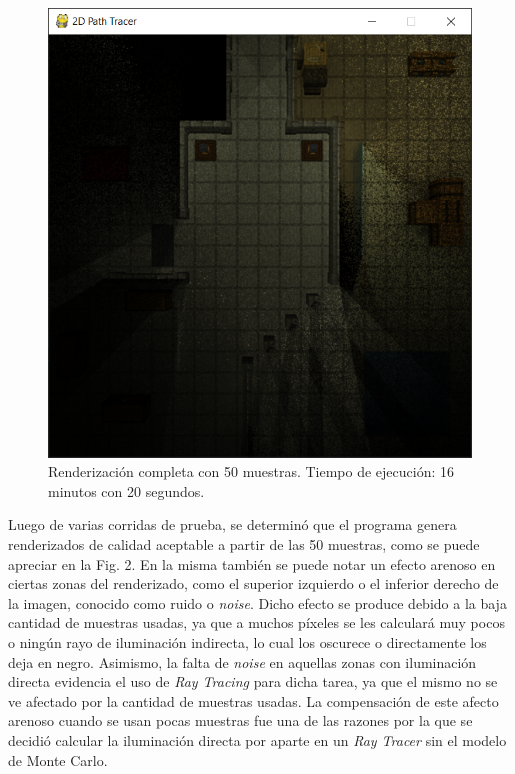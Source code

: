 \documentclass[conference]{IEEEtran}
\begin{document}
\begin{figure}[htbp]
\centerline{\includegraphics[scale=0.68]{Imagenes/Complete Lighting (50 Samples).png}}
\caption{Renderización completa con 50 muestras. Tiempo de ejecución: 16 minutos con 20 segundos.}
\label{50 muestras completo}
\end{figure}

Luego de varias corridas de prueba, se determinó que el programa genera renderizados de calidad aceptable a partir de las 50 muestras, como se puede apreciar en la Fig. 2. En la misma también se puede notar un efecto arenoso en ciertas zonas del renderizado, como el superior izquierdo o el inferior derecho de la imagen, conocido como ruido o \textit{noise}. Dicho efecto se produce debido a la baja cantidad de muestras usadas, ya que a muchos píxeles se les calculará muy pocos o ningún rayo de iluminación indirecta, lo cual los oscurece o directamente los deja en negro. Asimismo, la falta de \textit{noise} en aquellas zonas con iluminación directa evidencia el uso de \textit{Ray Tracing} para dicha tarea, ya que el mismo no se ve afectado por la cantidad de muestras usadas. La compensación de este afecto arenoso cuando se usan pocas muestras fue una de las razones por la que se decidió calcular la iluminación directa por aparte en un \textit{Ray Tracer} sin el modelo de Monte Carlo.
\end{document}
